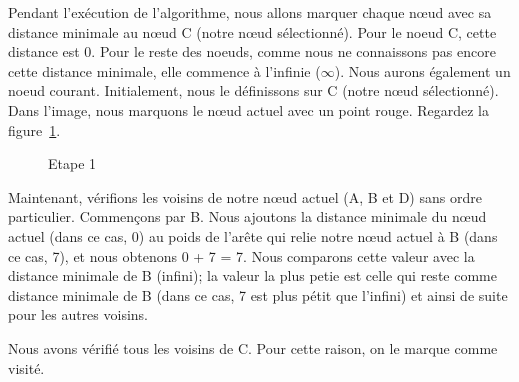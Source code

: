 Pendant l'exécution de l'algorithme, nous allons marquer chaque nœud avec sa
distance minimale au nœud C (notre nœud sélectionné). Pour le noeud C, cette
distance est 0. Pour le reste des noeuds, comme nous ne connaissons pas encore
cette distance minimale, elle commence à l'infinie ($\infty$).
Nous aurons également un noeud courant. Initialement, nous le définissons sur C
(notre nœud sélectionné). Dans l'image, nous marquons le nœud actuel avec un
point rouge. Regardez la figure~\ref{fig:all_inf}.

\begin{figure}[!htb]
\centering
{}
\caption{Etape 1}\label{fig:all_inf}
\end{figure}

Maintenant, vérifions les voisins de notre nœud actuel (A, B et D) sans ordre particulier. Commençons par B. Nous ajoutons la distance minimale du nœud actuel (dans ce cas, 0) au poids de l'arête qui relie notre nœud actuel à B (dans ce cas, 7), et nous obtenons 0 + 7 = 7. Nous comparons cette valeur avec la distance minimale de B (infini); la valeur la plus petie est celle qui reste comme distance minimale de B (dans ce cas, 7 est plus pétit que l'infini) et ainsi de suite pour les autres voisins.

Nous avons vérifié tous les voisins de C. Pour cette raison, on le marque comme visité.

